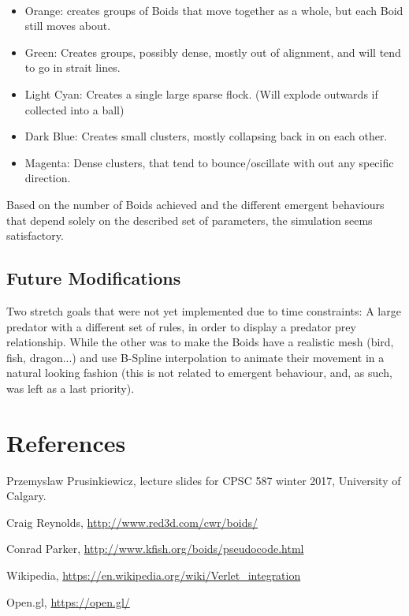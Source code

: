 \documentclass[12pt]{article}
\begin{document}
\\
\begin{itemize}
	\item Orange: creates groups of Boids that move together as a whole, but each Boid still moves about.
	
	\item Green: Creates groups, possibly dense, mostly out of alignment, and will tend to go in strait lines.
	
	\item Light Cyan: Creates a single large sparse flock. (Will explode outwards if collected into a ball)
	
	\item Dark Blue: Creates small clusters, mostly collapsing back in on each other.
	
	\item Magenta: Dense clusters, that tend to bounce/oscillate with out any specific direction.
\end{itemize}

Based on the number of Boids achieved and the different emergent behaviours that depend solely on the described set of parameters, the simulation seems satisfactory.


\subsection*{Future Modifications}
Two stretch goals that were not yet implemented due to time constraints: A large predator with a different set of rules, in order to display a predator prey relationship. While the other was to make the Boids have a realistic mesh (bird, fish, dragon...) and use B-Spline interpolation to animate their movement in a natural looking fashion (this is not related to emergent behaviour, and, as such, was left as a last priority).

\section*{References}

\begin{enumerate}[label={[\arabic*]}]
	\item Przemyslaw Prusinkiewicz, lecture slides for CPSC 587 winter 2017, University of Calgary.
	
	\item Craig Reynolds, \url{http://www.red3d.com/cwr/boids/}
	
	\item Conrad Parker, \url{http://www.kfish.org/boids/pseudocode.html}
	
	\item Wikipedia,  \url{https://en.wikipedia.org/wiki/Verlet_integration}
	
	\item Open.gl, \url{https://open.gl/}
\end{enumerate}
\end{document}
